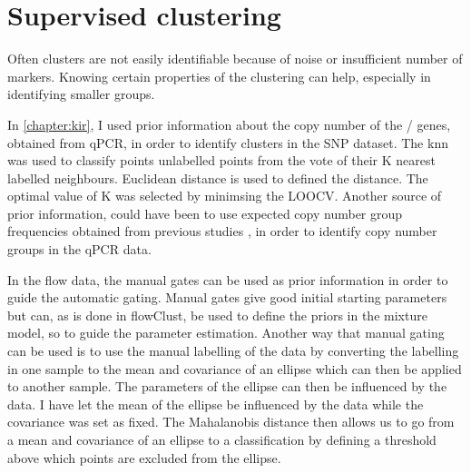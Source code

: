 
\section{Supervised clustering}

Often clusters are not easily identifiable because of noise or insufficient number of markers.
Knowing certain properties of the clustering can help, especially in identifying smaller groups.

In \cref{chapter:kir}, I used prior information about the copy number of the / genes, obtained from qPCR,
in order to identify clusters in the SNP dataset.
The \gls{knn} was used to classify points unlabelled points from the vote of their K nearest labelled neighbours.
Euclidean distance is used to defined the distance.
The optimal value of K was selected by minimsing the \gls{LOOCV}.
Another source of prior information,
could have been to use expected copy number group frequencies obtained from previous studies 
\citet{Jiang:2012cf}, in order to identify copy number groups in the qPCR data.

In the flow data, the manual gates can be used as prior information in order to guide the automatic gating.  
Manual gates give good initial starting parameters but can, as is done in flowClust, be used to define the priors in the mixture model,
so to guide the parameter estimation.
Another way that manual gating can be used is to use the manual labelling of the data by converting the labelling in one sample to
the mean and covariance of an ellipse which can then be applied to another sample.
The parameters of the ellipse can then be influenced by the data.
I have let the mean of the ellipse be influenced by the data while the covariance was set as fixed.
The Mahalanobis distance then allows us to go from a mean and covariance of an ellipse to a classification by defining a threshold
above which points are excluded from the ellipse.

